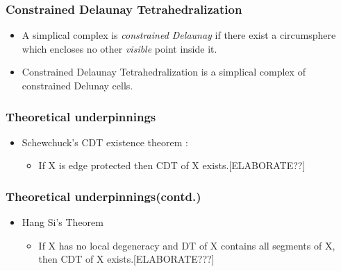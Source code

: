 \documentclass{beamer}
\begin{document}
	\begin{frame}
		\frametitle{Constrained Delaunay Tetrahedralization}
			\begin{itemize}
				\item A simplical complex is \textit{constrained Delaunay} if there exist a circumsphere which encloses no other \textit{visible} point inside it.
				\item Constrained Delaunay Tetrahedralization is a simplical complex of constrained Delunay cells.
			\end{itemize}
	\end{frame}	
	\begin{frame}
		\frametitle{Theoretical underpinnings}
			\begin{itemize}
				\item	Schewchuck's CDT existence theorem \cite{schewCDTExistence}:
					\begin{itemize}
						\item If X is edge protected then CDT of X exists.[ELABORATE??]	
					\end{itemize}	
			\end{itemize}
	\end{frame}				
	\begin{frame}	
		\frametitle{Theoretical underpinnings(contd.)}
			\begin{itemize}
				\item	Hang Si's Theorem \cite{hangSiMeshingPLCByCDT}
					\begin{itemize}
						\item If X has no local degeneracy and DT of X contains all segments of X, then CDT of X exists.[ELABORATE???] 
					\end{itemize}		
			\end{itemize}		
	\end{frame}	
\end{document}
